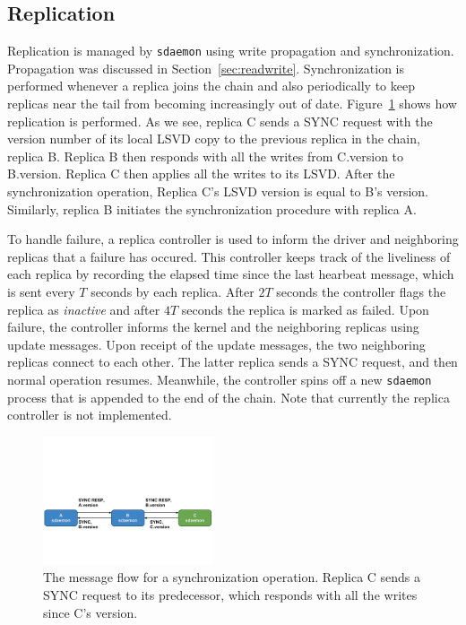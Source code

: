 \subsection{Replication}
\label{sec:replication}
Replication is managed by \texttt{sdaemon} using write propagation and 
synchronization. Propagation was discussed in Section~\ref{sec:readwrite}. 
Synchronization is performed whenever a replica joins the chain and also 
periodically to keep replicas near the tail from becoming increasingly out 
of date. Figure~\ref{fig:sync} shows how replication is performed. As we see,
replica C sends a SYNC request with the version number of its local LSVD 
copy to the previous replica in the chain, replica B. Replica B then responds
with all the writes from C.version to B.version. Replica C then applies all 
the writes to its LSVD. After the synchronization operation, Replica C's 
LSVD version is equal to B's version. Similarly, replica B initiates the 
synchronization procedure with replica A.

To handle failure, a replica controller is used to inform the driver and 
neighboring replicas that a failure has occured. This controller keeps track 
of the liveliness of each replica by recording the elapsed time since the 
last hearbeat message, which is sent every $T$ seconds by each replica. After
$2T$ seconds the controller flags the replica as \emph{inactive} and after 
$4T$ seconds the replica is marked as failed. Upon failure, the controller 
informs the kernel and the neighboring replicas using update messages. Upon
receipt of the update messages, the two neighboring replicas connect to each
other. The latter replica sends a SYNC request, and then normal operation 
resumes. Meanwhile, the controller spins off a new \texttt{sdaemon} process
that is appended to the end of the chain. Note that currently the replica 
controller is not implemented.

\begin{figure}[t]
    \includegraphics[width=0.45\textwidth, trim=0 2in 0 3in, clip]{./figures/sync.pdf}
    \caption{The message flow for a synchronization operation. Replica C 
            sends a SYNC request to its predecessor, which responds with all
            the writes since C's version.}
    \label{fig:sync}
\end{figure}

